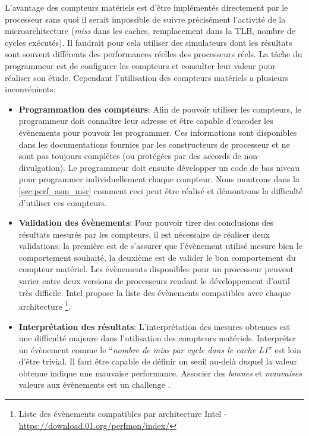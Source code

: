         L'avantage des compteurs matériels est d'être implémentés directement par le processeur sans quoi il serait impossible de suivre précisément l'activité de la microarchitecture (\textit{miss} dans les caches, remplacement dans la TLB, nombre de cycles exécutés). Il faudrait pour cela utiliser des simulateurs dont les résultats sont souvent différents des performances réelles des processeurs réels. La tâche du programmeur est de configurer les compteurs et consulter leur valeur pour réaliser son étude. Cependant l'utilisation des compteurs matériels a plusieurs inconvénients:
        \begin{itemize}
        
            \item \textbf{Programmation des compteurs}: Afin de pouvoir utiliser les compteurs, le programmeur doit connaître leur adresse et être capable d'encoder les évènements pour pouvoir les programmer. Ces informations sont disponibles dans les documentations fournies par les constructeurs de processeur et ne sont pas toujours complètes (ou protégées par des accords de non-divulgation). Le programmeur doit ensuite développer un code de bas niveau pour programmer individuellement chaque compteur. Nous montrons dans la \autoref{sec:perf_asm_msr} comment ceci peut être réalisé et démontrons la difficulté d'utiliser ces compteurs.
            
            \item \textbf{Validation des évènements}: Pour pouvoir tirer des conclusions des résultats mesurés par les compteurs, il est nécessaire de réaliser deux validations: la première est de s'assurer que l'évènement utilisé mesure bien le comportement souhaité, la deuxième est de valider le bon comportement du compteur matériel. Les évènements disponibles pour un processeur peuvent varier entre deux versions de processeurs rendant le développement d'outil très difficile. Intel propose la liste des évènements compatibles avec chaque architecture \footnote{Liste des évènements compatibles par architecture Intel - \url{https://download.01.org/perfmon/index/}}.
            
            \item \textbf{Interprétation des résultats}: L'interprétation des mesures obtenues est une difficulté majeure dans l'utilisation des compteurs matériels. Interpréter un évènement comme le ``\textit{nombre de miss par cycle dans le cache L1}'' est loin d'être trivial. Il faut être capable de définir un seuil au-delà duquel la valeur obtenue indique une mauvaise performance. Associer des \textit{bonnes} et \textit{mauvaises} valeurs aux évènements est un challenge \cite{Moseley2011}.
            
        \end{itemize}
        
